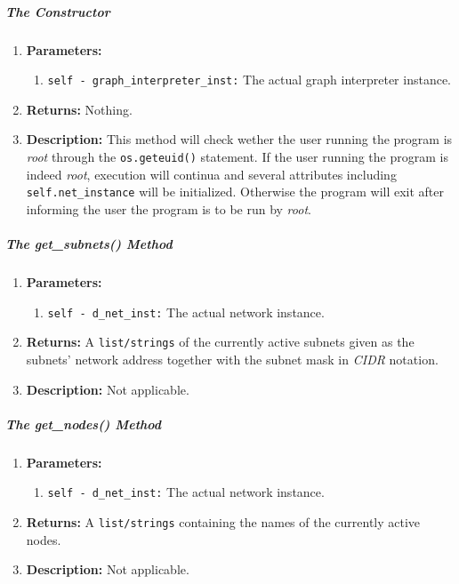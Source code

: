     \subparagraph{The Constructor}
        \begin{enumerate}
            \item \textbf{Parameters:}
            \begin{enumerate}
                \item \texttt{self - graph\_interpreter\_inst:} The actual graph interpreter instance.
            \end{enumerate}
            \item \textbf{Returns:} Nothing.
            \item \textbf{Description:} This method will check wether the user running the program is \textit{root} through the \texttt{os.geteuid()} statement. If the user running the program is indeed \textit{root}, execution will continua and several attributes including \texttt{self.net\_instance} will be initialized. Otherwise the program will exit after informing the user the program is to be run by \textit{root}.
        \end{enumerate}

    \subparagraph{The get\_subnets() Method}
        \begin{enumerate}
            \item \textbf{Parameters:}
            \begin{enumerate}
                \item \texttt{self - d\_net\_inst:} The actual network instance.
            \end{enumerate}
            \item \textbf{Returns:} A \texttt{list/strings} of the currently active subnets given as the subnets' network address together with the subnet mask in \textit{CIDR} notation.
            \item \textbf{Description:} Not applicable.
        \end{enumerate}

    \subparagraph{The get\_nodes() Method}
        \begin{enumerate}
            \item \textbf{Parameters:}
            \begin{enumerate}
                \item \texttt{self - d\_net\_inst:} The actual network instance.
            \end{enumerate}
            \item \textbf{Returns:} A \texttt{list/strings} containing the names of the currently active nodes.
            \item \textbf{Description:} Not applicable.
        \end{enumerate}

